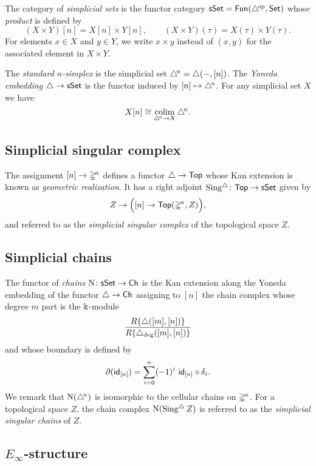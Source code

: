 The category of \textit{simplicial sets} is the functor category $\mathsf{sSet} = \mathsf{Fun}(\triangle^{\!\mathrm{op}}, \mathsf{Set})$ whose \textit{product} is defined by
\[
(X \times Y)[n] = X[n] \times Y[n], \qquad
(X \times Y)(\tau) = X(\tau) \times Y(\tau).
\]
For elements $x \in X$ and $y \in Y$, we write $x \times y$ instead of $(x, y)$ for the associated element in $X \times Y$.

The \textit{standard $n$-simplex} is the simplicial set $\triangle^{\!n} = \triangle(-, [n])$.
The \textit{Yoneda embedding} $\triangle \to \mathsf{sSet}$ is the functor induced by $[n] \mapsto \triangle^{\!n}$.
For any simplicial set $X$ we have
\[
X[n] \cong \operatorname*{colim}_{\triangle^{\!n} \to X} \triangle^{\!n}.
\]

\subsection{Simplicial singular complex}

The assignment $[n] \to \mathbb{\Delta}^{\!n}$ defines a functor $\triangle \to \mathsf{Top}$ whose Kan extension is known as \textit{geometric realization}.
It has a right adjoint $\operatorname{Sing^{\triangle}} \colon \mathsf{Top} \to \mathsf{sSet}$ given by
\[
Z \to \Big([n] \to \mathsf{Top}(\mathbb{\Delta}^{\!n}, Z)\Big),
\]
and referred to as the \textit{simplicial singular complex} of the topological space $Z$.

\subsection{Simplicial chains} \label{ss:simplicial chains}

The functor of \textit{chains} $\operatorname{N} \colon \mathsf{sSet} \to \mathsf{Ch}$ is the Kan extension along the Yoneda embedding of the functor $\triangle \to \mathsf{Ch}$ assigning to $[n]$ the chain complex whose degree $m$ part is the $\Bbbk$-module
\[
\frac{R\{\triangle([m], [n])\}}{R\{\triangle_{\deg}([m], [n])\}}
\]
and whose boundary is defined by
\[
\partial (\mathsf{id}_{[n]}) = \sum_{i=0}^{n} (-1)^i \ \mathsf{id}_{[n]} \circ \delta_i.
\]
We remark that $\operatorname{N}(\triangle^{\!n})$ is isomorphic to the cellular chains on $\mathbb{\Delta}^{\!n}$.
For a topological space $Z$, the chain complex $\operatorname{N}(\operatorname{Sing^{\triangle}} Z)$ is referred to as the \textit{simplicial singular chains} of $Z$.

\subsection{$E_\infty$-structure} \label{ss:e infinity structures}

